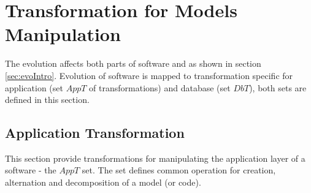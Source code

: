 \documentclass[11pt]{article}
\begin{document}
\section{Transformation for Models Manipulation}
The evolution affects both parts of software and as shown in section \ref{sec:evoIntro}. Evolution of software is mapped to transformation specific for application (set $AppT$ of transformations) and database (set $DbT$), both sets are defined in this section.

\subsection{Application Transformation}
This section provide transformations for manipulating the application layer of a software - the $AppT$ set. The set defines common operation for creation, alternation and decomposition of a model (or code).

\end{document}
